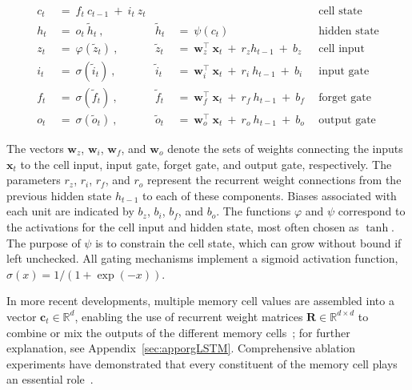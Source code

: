 \begin{align}
c_t \ &= \  f_t \ c_{t-1} \ + \ i_t \ z_t &  & &\text{cell state} \\
h_t  \ &= \ o_t \ \tilde{h}_t \ , & \tilde{h}_t \ &= \ \psi \left( c_t\right)
  &\text{hidden state} \\
z_t \ &= \ \varphi \left( \tilde{z}_t \right) \ , 
  &\tilde{z}_t \ &=  \ \mathbf{w}^\top_{z} \ \mathbf{x}_t \ + \
  r_{z}  h_{t-1} \ + \  b_{z} \ \
  &\text{cell input} \\
i_t \ &= \ \sigma \left( \tilde{i}_t  \right) \ , 
  &\tilde{i}_t \ &= \ \mathbf{w}^\top_{i} \ \mathbf{x}_t \ + \
  r_{i}  \ h_{t-1} \ + \  b_{i} \ \
  &\text{input gate} \\
f_t \ &= \ \sigma \left(  \tilde{f}_t \right) \ , 
  &\tilde{f}_t \ &= \ \mathbf{w}^\top_{f} \ \mathbf{x}_t  \ + \
  r_{f}  \ h_{t-1} \ + \  b_{f} \ \
  &\text{forget gate} \\
o_t \ &= \ \sigma \left( \tilde{o}_t \right) \ , 
  &\tilde{o}_t  \ &= \ \mathbf{w}^\top_{o} \ \mathbf{x}_t \ + \
  r_{o}  \ h_{t-1} \ + \  b_{o} \ \
  &\text{output gate} 
\end{align}

The vectors $\mathbf{w}_{z}$, $\mathbf{w}_{i}$, $\mathbf{w}_{f}$, and $\mathbf{w}_{o}$ denote the sets of weights connecting the inputs $\mathbf{x}_t$ to the cell input, input gate, forget gate, and output gate, respectively. The parameters $r_{z}$, $r_{i}$, $r_{f}$, and $r_{o}$ represent the recurrent weight connections from the previous hidden state $h_{t-1}$ to each of these components. Biases associated with each unit are indicated by $b_{z}$, $b_{i}$, $b_{f}$, and $b_{o}$. The functions $\varphi$ and $\psi$ correspond to the activations for the cell input and hidden state, most often chosen as $\tanh$. The purpose of $\psi$ is to constrain the cell state, which can grow without bound if left unchecked. All gating mechanisms implement a sigmoid activation function, $\sigma \left( x \right)= 1/(1+\exp(-x))$. 

In more recent developments, multiple memory cell values are assembled into a vector $\mathbf{c}_t \in \mathbb{R}^{d}$, enabling the use of recurrent weight matrices $\mathbf{R} \in \mathbb{R}^{d \times d}$ to combine or mix the outputs of the different memory cells~\citep{Greff:15}; for further explanation, see Appendix~\ref{sec:apporgLSTM}. Comprehensive ablation experiments have demonstrated that every constituent of the memory cell plays an essential role~\citep{Greff:15}.

